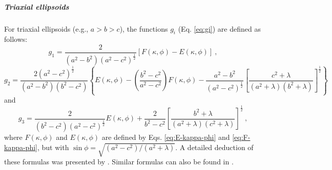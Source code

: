 \documentclass[gmd, manuscript]{copernicus}
\begin{document}
\subparagraph*{Triaxial ellipsoids}


For triaxial ellipsoids (e.g., $a > b > c$), the functions
$g_{i}$ (Eq. \ref{eq:gi}) are defined as follows:
\begin{equation}
g_{1} = \frac{2}{\left( a^{2} - b^{2} \right) \left( a^{2} - c^{2} \right)^{\frac{1}{2}}}
\left[ F(\kappa, \phi) - E(\kappa, \phi) \right] \: ,
\label{eq:g1-triaxial}
\end{equation}
\begin{equation}
g_{2} = \frac{2 \left( a^{2} - c^{2} \right)^{\frac{1}{2}}}{\left( a^{2} - b^{2} \right)\left( b^{2} - c^{2} \right)}
\left\lbrace
E\left(\kappa, \phi \right)
- \left( \frac{b^{2} - c^{2}}{a^{2} - c^{2}} \right)
F\left(\kappa, \phi \right) -
\frac{a^{2} - b^{2}}{\left( a^{2} - c^{2} \right)^{\frac{1}{2}}} \left[
\frac{c^{2} + \lambda}{\left( a^{2} + \lambda \right)\left( b^{2} + \lambda \right)}
\right]^{\frac{1}{2}} \right\rbrace
\label{eq:g2-triaxial}
\end{equation}
and
\begin{equation}
g_{3} = \frac{2}{\left( b^{2} - c^{2} \right) \left( a^{2} - c^{2} \right)^{\frac{1}{2}}}
E\left(\kappa, \phi \right) +
\frac{2}{b^{2} - c^{2}}
\left[
\frac{b^{2} + \lambda}{\left( a^{2} + \lambda \right)\left( c^{2} + \lambda \right)}
\right]^{\frac{1}{2}}
\: ,
\label{eq:g3-triaxial}
\end{equation}
where $F(\kappa, \phi)$ and $E(\kappa, \phi)$ are defined by
Eqs. \ref{eq:E-kappa-phi} and \ref{eq:F-kappa-phi}, but with
$\sin \phi = \sqrt{\left( a^{2} - c^{2} \right)/\left( a^{2} + \lambda \right)}$.
A detailed deduction of these formulas was presented by \citet{tejedor1995}.
Similar formulas can also be found in \citet{clark1986}.
\end{document}
